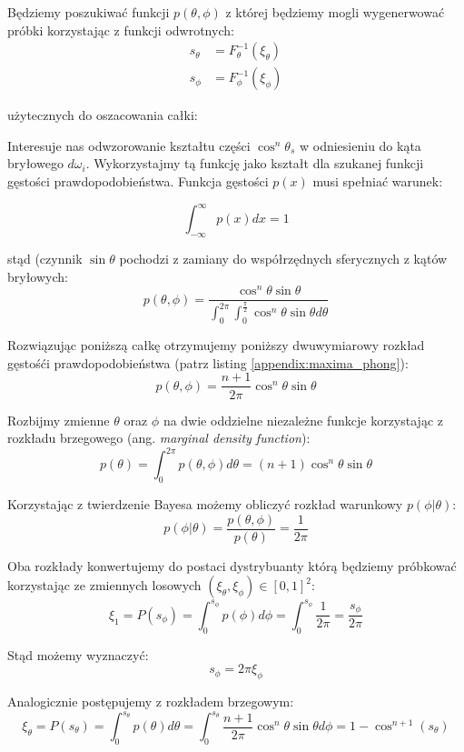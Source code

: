 \documentclass[../main.tex]{subfiles}
\begin{document}
Będziemy poszukiwać funkcji $p(\theta, \phi)$ z której będziemy mogli wygenerwować próbki korzystając z funkcji
odwrotnych:
\begin{align*}
  s_\theta &= F_{\theta}^{-1}(\xi_\theta) \\
  s_\phi &= F_{\phi}^{-1}(\xi_\phi)
\end{align*}

\noindent użytecznych do oszacowania całki:

Interesuje nas odwzorowanie kształtu części $\cos^{n}\theta_s$ w odniesieniu do kąta bryłowego
$d\omega_i$. Wykorzystajmy tą funkcję jako kształt dla szukanej funkcji gęstości
prawdopodobieństwa. Funkcja gęstości $p(x)$ musi spełniać warunek:

\[ \int_{-\infty}^{\infty} p(x) dx = 1 \]

\noindent stąd (czynnik $\sin\theta$ pochodzi z zamiany do współrzędnych
sferycznych z kątów bryłowych:
\[
  p(\theta, \phi) = \frac{
    \cos^{n}{\theta} \sin\theta
  }{
    \int_{0}^{2\pi} \int_{0}^{\frac{\pi}{2}} {
      \cos^{n}{\theta} \sin\theta d\theta
    }
  }
\]

Rozwiązując poniższą całkę otrzymujemy poniższy dwuwymiarowy rozkład gęstośći
prawdopodobieństwa (patrz listing \ref{appendix:maxima_phong}):
\[
  p(\theta, \phi) =
    \frac{n+1}{2\pi} \cos^{n}\theta \sin\theta
\]

Rozbijmy zmienne $\theta$ oraz $\phi$ na dwie oddzielne niezależne funkcje
korzystając z rozkładu brzegowego (ang. \textit{marginal density function}):
\[
  p(\theta) = \int_{0}^{2\pi} {
    p(\theta, \phi) d \theta
  } =
  (n+1) \cos^{n}{\theta} \sin\theta
\]

Korzystając z twierdzenie Bayesa możemy obliczyć rozkład warunkowy $p(\phi | \theta)$:
\[
  p(\phi | \theta) = \frac{
    p(\theta, \phi)
	}{
		p(\theta)
	} = \frac{1}{2\pi}
\]

Oba rozkłady konwertujemy do postaci dystrybuanty którą będziemy próbkować
korzystając ze zmiennych losowych $(\xi_{\theta}, \xi_{\phi}) \in [0,1]^2$:
\[
	\xi_1 = P(s_{\phi}) =
	\int_{0}^{s_{\phi}} {
		p(\phi) d\phi
	} =
	\int_{0}^{s_{\phi}} {
		\frac{1}{2\pi}
	} =
	\frac{s_{\phi}}{2\pi}
\]

Stąd możemy wyznaczyć:
\[
	s_{\phi} = 2 \pi \xi_{\phi}
\]

Analogicznie postępujemy z rozkładem brzegowym:
\[
  \xi_{\theta} = P(s_{\theta}) =
	\int_{0}^{s_{\theta}} {
		p(\theta) d\theta
	} =
	\int_{0}^{s_{\theta}} {
		\frac{n+1}{2\pi} \cos^{n}\theta \sin\theta d\phi
	} =
	1 - \cos^{n+1}(s_{\theta})
\]
\end{document}
